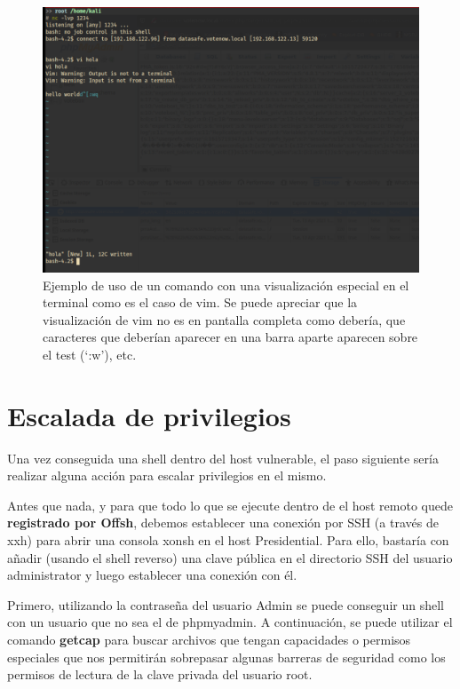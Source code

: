 \begin{figure}[!hbt]
  \centering
  \includegraphics[width=\textwidth]{imagenes/vimreshell.png}
  \caption{Ejemplo de uso de un comando con una visualización especial en el terminal como es el caso de vim. Se puede apreciar que la visualización de vim no es en pantalla completa como debería, que caracteres que deberían aparecer en una barra aparte aparecen sobre el test (`:w'), etc.}
   \label{vims}
\end{figure}



\section{Escalada de privilegios}

Una vez conseguida una shell dentro del host vulnerable, el paso siguiente sería realizar alguna acción para escalar privilegios en el mismo. 

Antes que nada, y para que todo lo que se ejecute dentro de el host remoto quede \textbf{registrado por Offsh}, debemos establecer una conexión por SSH (a través de xxh) para abrir una consola xonsh en el host Presidential. Para ello, bastaría con añadir (usando el shell reverso) una clave pública en el directorio SSH del usuario administrator y luego establecer una conexión con él.



Primero, utilizando la contraseña del usuario Admin se puede conseguir un shell con un usuario que no sea el de phpmyadmin. A continuación, se puede utilizar el comando \textbf{getcap} para buscar archivos que tengan capacidades o permisos especiales que nos permitirán sobrepasar algunas barreras de seguridad como los permisos de lectura de la clave privada del usuario root.

